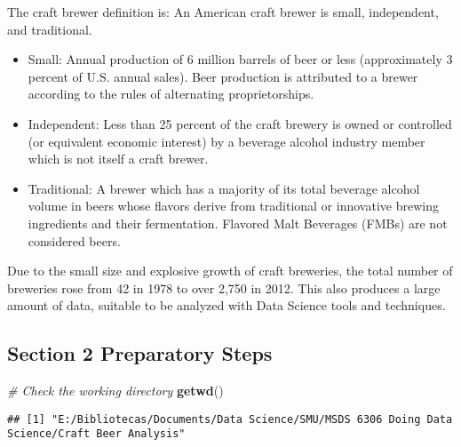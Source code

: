 \documentclass[]{article}
\newenvironment{Shaded}{\begin{snugshade}}{\end{snugshade}}
\newcommand{\KeywordTok}[1]{\textcolor[rgb]{0.13,0.29,0.53}{\textbf{{#1}}}}
\newcommand{\CommentTok}[1]{\textcolor[rgb]{0.56,0.35,0.01}{\textit{{#1}}}}
\newcommand{\NormalTok}[1]{{#1}}
\begin{document}
The craft brewer definition is: An American craft brewer is small,
independent, and traditional.

\begin{itemize}
\item
  Small: Annual production of 6 million barrels of beer or less
  (approximately 3 percent of U.S. annual sales). Beer production is
  attributed to a brewer according to the rules of alternating
  proprietorships.
\item
  Independent: Less than 25 percent of the craft brewery is owned or
  controlled (or equivalent economic interest) by a beverage alcohol
  industry member which is not itself a craft brewer.
\item
  Traditional: A brewer which has a majority of its total beverage
  alcohol volume in beers whose flavors derive from traditional or
  innovative brewing ingredients and their fermentation. Flavored Malt
  Beverages (FMBs) are not considered beers.
\end{itemize}

Due to the small size and explosive growth of craft breweries, the total
number of breweries rose from 42 in 1978 to over 2,750 in 2012. This
also produces a large amount of data, suitable to be analyzed with Data
Science tools and techniques.

\subsection{\texorpdfstring{\textbf{Section 2} Preparatory
Steps}{Section 2 Preparatory Steps}}\label{section-2-preparatory-steps}

\begin{Shaded}
\begin{Highlighting}[]
\CommentTok{# Check the working directory}
\KeywordTok{getwd}\NormalTok{()}
\end{Highlighting}
\end{Shaded}

\begin{verbatim}
## [1] "E:/Bibliotecas/Documents/Data Science/SMU/MSDS 6306 Doing Data Science/Craft Beer Analysis"
\end{verbatim}
\end{document}
